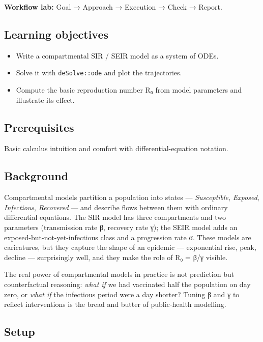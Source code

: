 \documentclass[
]{article}
\author{}
\date{\vspace{-2.5em}}
\providecommand{\tightlist}{%
  \setlength{\itemsep}{0pt}\setlength{\parskip}{0pt}}
\begin{document}
\textbf{Workflow lab:} Goal → Approach → Execution → Check → Report.

\subsection{Learning objectives}\label{learning-objectives}

\begin{itemize}
\tightlist
\item
  Write a compartmental SIR / SEIR model as a system of ODEs.
\item
  Solve it with \texttt{deSolve::ode} and plot the trajectories.
\item
  Compute the basic reproduction number R₀ from model parameters and
  illustrate its effect.
\end{itemize}

\subsection{Prerequisites}\label{prerequisites}

Basic calculus intuition and comfort with differential-equation
notation.

\subsection{Background}\label{background}

Compartmental models partition a population into states ---
\emph{Susceptible}, \emph{Exposed}, \emph{Infectious}, \emph{Recovered}
--- and describe flows between them with ordinary differential
equations. The SIR model has three compartments and two parameters
(transmission rate β, recovery rate γ); the SEIR model adds an
exposed-but-not-yet-infectious class and a progression rate σ. These
models are caricatures, but they capture the shape of an epidemic ---
exponential rise, peak, decline --- surprisingly well, and they make the
role of R₀ = β/γ visible.

The real power of compartmental models in practice is not prediction but
counterfactual reasoning: \emph{what if} we had vaccinated half the
population on day zero, or \emph{what if} the infectious period were a
day shorter? Tuning β and γ to reflect interventions is the bread and
butter of public-health modelling.

\subsection{Setup}\label{setup}
\end{document}
